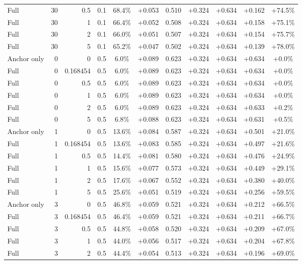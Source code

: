 \begin{table}[htbp]
\begin{tabular}{lrrrccccccc}
Full & 30 & 0.5 & 0.1 & 68.4\% & +0.053 & 0.510 & +0.324 & +0.634 & +0.162 & +74.5\% \\
Full & 30 & 1 & 0.1 & 66.4\% & +0.052 & 0.508 & +0.324 & +0.634 & +0.158 & +75.1\% \\
Full & 30 & 2 & 0.1 & 66.0\% & +0.051 & 0.507 & +0.324 & +0.634 & +0.154 & +75.7\% \\
Full & 30 & 5 & 0.1 & 65.2\% & +0.047 & 0.502 & +0.324 & +0.634 & +0.139 & +78.0\% \\
Anchor only & 0 & 0 & 0.5 & 6.0\% & +0.089 & 0.623 & +0.324 & +0.634 & +0.634 & +0.0\% \\
Full & 0 & 0.168454 & 0.5 & 6.0\% & +0.089 & 0.623 & +0.324 & +0.634 & +0.634 & +0.0\% \\
Full & 0 & 0.5 & 0.5 & 6.0\% & +0.089 & 0.623 & +0.324 & +0.634 & +0.634 & +0.0\% \\
Full & 0 & 1 & 0.5 & 6.0\% & +0.089 & 0.623 & +0.324 & +0.634 & +0.634 & +0.0\% \\
Full & 0 & 2 & 0.5 & 6.0\% & +0.089 & 0.623 & +0.324 & +0.634 & +0.633 & +0.2\% \\
Full & 0 & 5 & 0.5 & 6.8\% & +0.088 & 0.623 & +0.324 & +0.634 & +0.631 & +0.5\% \\
Anchor only & 1 & 0 & 0.5 & 13.6\% & +0.084 & 0.587 & +0.324 & +0.634 & +0.501 & +21.0\% \\
Full & 1 & 0.168454 & 0.5 & 13.6\% & +0.083 & 0.585 & +0.324 & +0.634 & +0.497 & +21.6\% \\
Full & 1 & 0.5 & 0.5 & 14.4\% & +0.081 & 0.580 & +0.324 & +0.634 & +0.476 & +24.9\% \\
Full & 1 & 1 & 0.5 & 15.6\% & +0.077 & 0.573 & +0.324 & +0.634 & +0.449 & +29.1\% \\
Full & 1 & 2 & 0.5 & 17.6\% & +0.067 & 0.552 & +0.324 & +0.634 & +0.380 & +40.0\% \\
Full & 1 & 5 & 0.5 & 25.6\% & +0.051 & 0.519 & +0.324 & +0.634 & +0.256 & +59.5\% \\
Anchor only & 3 & 0 & 0.5 & 46.8\% & +0.059 & 0.521 & +0.324 & +0.634 & +0.212 & +66.5\% \\
Full & 3 & 0.168454 & 0.5 & 46.4\% & +0.059 & 0.521 & +0.324 & +0.634 & +0.211 & +66.7\% \\
Full & 3 & 0.5 & 0.5 & 44.8\% & +0.058 & 0.520 & +0.324 & +0.634 & +0.209 & +67.0\% \\
Full & 3 & 1 & 0.5 & 44.0\% & +0.056 & 0.517 & +0.324 & +0.634 & +0.204 & +67.8\% \\
Full & 3 & 2 & 0.5 & 44.4\% & +0.054 & 0.513 & +0.324 & +0.634 & +0.196 & +69.0\% \\

\end{tabular}
\end{table}
